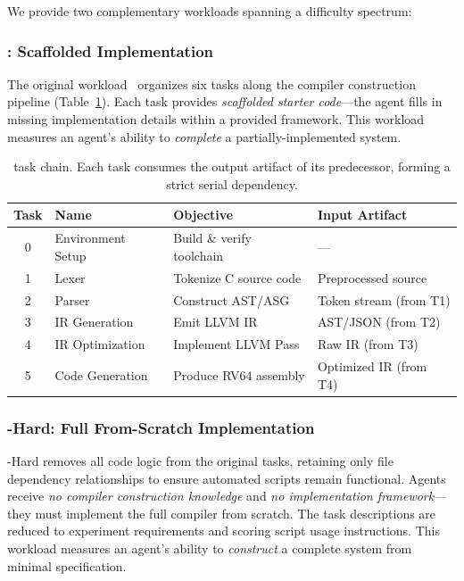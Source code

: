 We provide two complementary workloads spanning a difficulty spectrum:

\subsubsection{\yatcc{}: Scaffolded Implementation}

The original \yatcc{} workload~\cite{yatcc2024} organizes six tasks along the compiler construction pipeline (Table~\ref{tab:tasks}).
Each task provides \emph{scaffolded starter code}---the agent fills in missing implementation details within a provided framework.
This workload measures an agent's ability to \emph{complete} a partially-implemented system.

\begin{table}[!t]
\centering
\small
\begin{tabular}{clll}
\toprule
\textbf{Task} & \textbf{Name} & \textbf{Objective} & \textbf{Input Artifact} \\
\midrule
0 & Environment Setup & Build \& verify toolchain & --- \\
1 & Lexer & Tokenize C source code & Preprocessed source \\
2 & Parser & Construct AST/ASG & Token stream (from T1) \\
3 & IR Generation & Emit LLVM IR & AST/JSON (from T2) \\
4 & IR Optimization & Implement LLVM Pass & Raw IR (from T3) \\
5 & Code Generation & Produce RV64 assembly & Optimized IR (from T4) \\
\bottomrule
\end{tabular}
\caption{\eva{} task chain. Each task consumes the output artifact of its predecessor, forming a strict serial dependency.}
\label{tab:tasks}
\end{table}

\subsubsection{\yatcc{}-Hard: Full From-Scratch Implementation}

\yatcc{}-Hard removes all code logic from the original tasks, retaining only file dependency relationships to ensure automated scripts remain functional.
Agents receive \emph{no compiler construction knowledge} and \emph{no implementation framework}---they must implement the full compiler from scratch.
The task descriptions are reduced to experiment requirements and scoring script usage instructions.
This workload measures an agent's ability to \emph{construct} a complete system from minimal specification.


